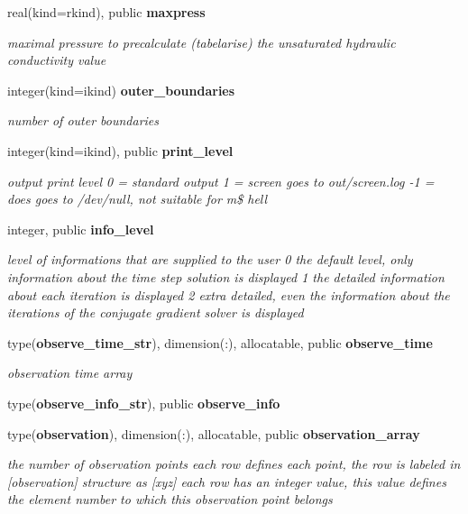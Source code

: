 \begin{DoxyCompactItemize}
real(kind=rkind), public {\bf maxpress}
\begin{DoxyCompactList}\small\item\em maximal pressure to precalculate (tabelarise) the unsaturated hydraulic conductivity value \end{DoxyCompactList}\item 
integer(kind=ikind) {\bf outer\+\_\+boundaries}
\begin{DoxyCompactList}\small\item\em number of outer boundaries \end{DoxyCompactList}\item 
integer(kind=ikind), public {\bf print\+\_\+level}
\begin{DoxyCompactList}\small\item\em output print level 0 = standard output 1 = screen goes to out/screen.\+log -\/1 = does goes to /dev/null, not suitable for m\$ hell \end{DoxyCompactList}\item 
integer, public {\bf info\+\_\+level}
\begin{DoxyCompactList}\small\item\em level of informations that are supplied to the user 0 the default level, only information about the time step solution is displayed 1 the detailed information about each iteration is displayed 2 extra detailed, even the information about the iterations of the conjugate gradient solver is displayed \end{DoxyCompactList}\item 
type({\bf observe\+\_\+time\+\_\+str}), dimension(\+:), allocatable, public {\bf observe\+\_\+time}
\begin{DoxyCompactList}\small\item\em observation time array \end{DoxyCompactList}\item 
type({\bf observe\+\_\+info\+\_\+str}), public {\bf observe\+\_\+info}
\item 
type({\bf observation}), dimension(\+:), allocatable, public {\bf observation\+\_\+array}
\begin{DoxyCompactList}\small\item\em the number of observation points each row defines each point, the row is labeled in [observation] structure as [xyz] each row has an integer value, this value defines the element number to which this observation point belongs \end{DoxyCompactList}\item 

\end{DoxyCompactItemize}
